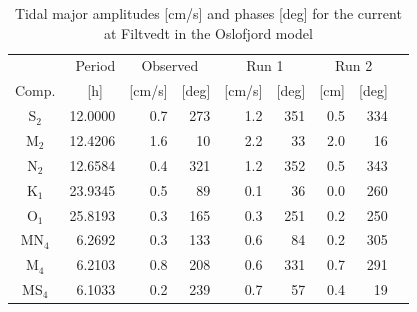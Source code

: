 \begin{table}[ht]
\caption{Tidal major amplitudes [cm/s] and phases [deg] for the current at Filtvedt in the Oslofjord model}
\label{tab:Filtvedt}
\centering
\begin{tabular}{crrrrrrrr} \hline
      & Period & \multicolumn{2}{c}{Observed} & \multicolumn{2}{c}{Run 1} & \multicolumn{2}{c}{Run 2} \\
Comp. & [h] $\;\;$ & [cm/s] & [deg] & [cm/s] & [deg] & [cm] & [deg] \\ \hline 
S$_2$  & 12.0000 &  0.7 & 273  &   1.2 & 351  &  0.5 & 334  \\
M$_2$  & 12.4206 &  1.6 &  10  &   2.2 &  33  &  2.0 &  16  \\
N$_2$  & 12.6584 &  0.4 & 321  &   1.2 & 352  &  0.5 & 343  \\
K$_1$  & 23.9345 &  0.5 &  89  &   0.1 &  36  &  0.0 & 260  \\
O$_1$  & 25.8193 &  0.3 & 165  &   0.3 & 251  &  0.2 & 250  \\
MN$_4$ &  6.2692 &  0.3 & 133  &   0.6 &  84  &  0.2 & 305  \\
M$_4$  &  6.2103 &  0.8 & 208  &   0.6 & 331  &  0.7 & 291  \\
MS$_4$ &  6.1033 &  0.2 & 239  &   0.7 &  57  &  0.4 &  19  \\ \hline 
\end{tabular}
\end{table}

